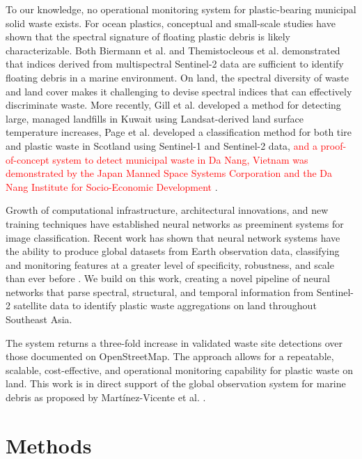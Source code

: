 \documentclass[10pt,letterpaper]{article}
\begin{document}
To our knowledge, no operational monitoring system for plastic-bearing municipal solid waste exists. For ocean plastics, conceptual \cite{goddijn2018concept} and small-scale \cite{acuna2018anthropogenic} studies have shown that the spectral signature of floating plastic debris is likely characterizable. Both Biermann et al. \cite{biermann2020finding} and Themistocleous et al. \cite{themistocleous2020investigating} demonstrated that indices derived from multispectral Sentinel-2 data are sufficient to identify floating debris in a marine environment. On land, the spectral diversity of waste and land cover makes it challenging to devise spectral indices that can effectively discriminate waste. More recently, Gill et al. \cite{gill2019detection} developed a method for detecting large, managed landfills in Kuwait using Landsat-derived land surface temperature increases, Page et al. \cite{page2020identification} developed a classification method for both tire and plastic waste in Scotland using Sentinel-1 and Sentinel-2 data, \textcolor{red}{and a proof-of-concept system to detect municipal waste in Da Nang, Vietnam was demonstrated by the Japan Manned Space Systems Corporation and the Da Nang Institute for Socio-Economic Development \cite{nguyen_pham_2022}}.

Growth of computational infrastructure, architectural innovations, and new training techniques have established neural networks as preeminent systems for image classification. Recent work has shown that neural network systems have the ability to produce global datasets from Earth observation data, classifying and monitoring features at a greater level of specificity, robustness, and scale than ever before \cite{li2020global}\cite{bonafilia2019building}\cite{kruitwagen2021global}\cite{9553499}. We build on this work, creating a novel pipeline of neural networks that parse spectral, structural, and temporal information from Sentinel-2 satellite data to identify plastic waste aggregations on land throughout Southeast Asia.

The system returns a three-fold increase in validated waste site detections over those documented on OpenStreetMap. The approach allows for a repeatable, scalable, cost-effective, and operational monitoring capability for plastic waste on land. This work is in direct support of the global observation system for marine debris as proposed by Martínez-Vicente et al. \cite{martinez2019measuring}.

\section*{Methods}
\end{document}
